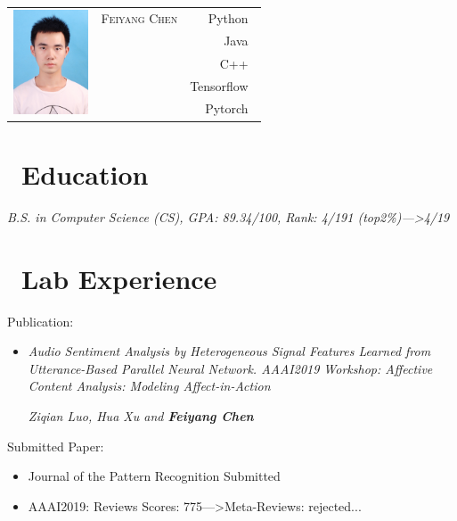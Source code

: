 \documentclass{resume}
\begin{document}

\Large{
  \begin{tabu}{ c l r }
    & \scshape{Feiyang Chen} & {Python~} \\
    &  & {Java~} \\
    &  & {C++~} \\
    &
      & {Tensorflow~} \\
    & 
     & {Pytorch~}
  \end{tabu}
}

\section{\faGraduationCap\ Education}
\textit{B.S. in Computer Science (CS), GPA: 89.34/100, Rank: 4/191 (top2\%)--->4/19}

\section{\faUsers\ Lab Experience}
Publication:
\begin{itemize}
	\item \textit{Audio Sentiment Analysis by Heterogeneous Signal Features Learned from Utterance-Based Parallel Neural Network. AAAI2019 Workshop: Affective Content Analysis: Modeling Affect-in-Action}
	
	\textit{Ziqian Luo, Hua Xu and \textbf{Feiyang Chen}}
\end{itemize}

Submitted Paper: 
\begin{itemize}
	\item Journal of the Pattern Recognition Submitted
	\item AAAI2019: Reviews Scores: 775--->Meta-Reviews: rejected...
\end{itemize}
\end{document}
